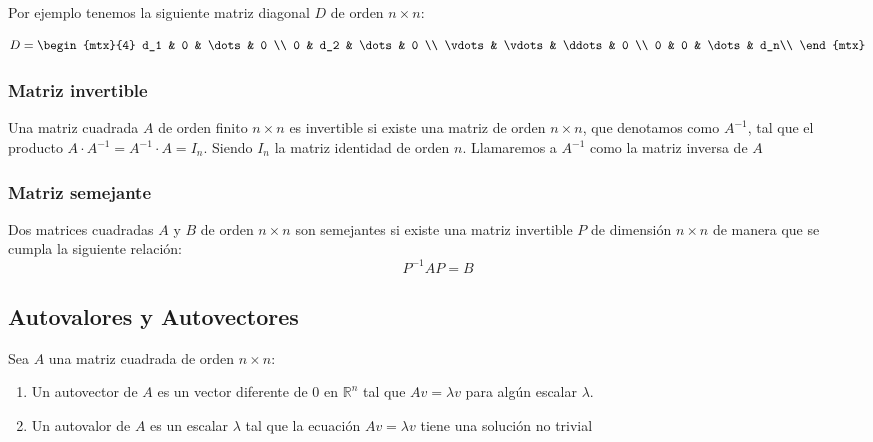 Por ejemplo tenemos la siguiente matriz diagonal $D$ de orden $n\times n$:

\[D =
  \begin{mtx}{4}
    d_1 & 0 & \dots & 0 \\
    0 & d_2 & \dots & 0 \\
    \vdots & \vdots & \ddots & 0 \\
    0 & 0 & \dots & d_n\\
  \end{mtx}
\]

\subsubsection{Matriz invertible}
\begin{definition}
Una matriz cuadrada $A$ de orden finito $n\times n$ es invertible si existe una matriz de orden $n \times n$, que denotamos como $A^{-1}$, tal que el producto $A \cdot A^{-1} = A^{-1}\cdot A= I_n$. Siendo $I_n$ la matriz identidad de orden $n$. Llamaremos a $A^{-1}$ como la matriz inversa de $A$    
\end{definition}

\subsubsection{Matriz semejante}
\begin{definition}
Dos matrices cuadradas $A$ y $B$ de orden $n \times n$ son semejantes si existe una matriz invertible $P$ de dimensión $n \times n$ de manera que se cumpla la siguiente relación:
\[
    P^{-1}AP = B 
\]    
\end{definition}


\subsection{Autovalores y Autovectores}
\begin{definition}
Sea $A$ una matriz cuadrada de orden $n \times n$:

\begin{enumerate}
    \item Un autovector de $A$ es un vector diferente de 0 en $\mathbb{R}^n$ tal que $Av = \lambda v$ para algún escalar $\lambda$.
    \item Un autovalor de $A$ es un escalar $\lambda$ tal que la ecuación $Av = \lambda v$ tiene una solución no trivial
\end{enumerate}    
\end{definition}

